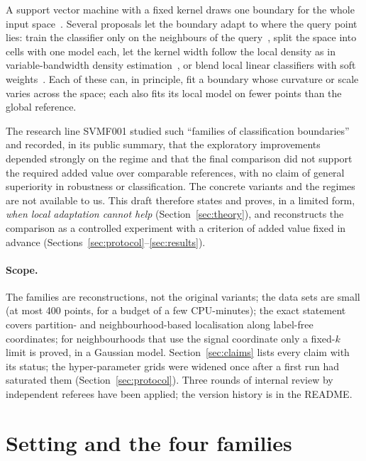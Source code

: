 \documentclass[11pt,a4paper]{article}
\theoremstyle{plain}
\theoremstyle{definition}
\theoremstyle{remark}
\begin{document}
A support vector machine with a fixed kernel draws one boundary for the whole input space~\citep{cortes1995,scholkopf2002,steinwart2008,hastie2009}. Several proposals let the boundary adapt to where the query point lies: train the classifier only on the neighbours of the query~\citep{bottou1992,zhang2006,cheng2007,segata2010}, split the space into cells with one model each, let the kernel width follow the local density as in variable-bandwidth density estimation~\citep{abramson1982,terrell1992}, or blend local linear classifiers with soft weights~\citep{ladicky2011}. Each of these can, in principle, fit a boundary whose curvature or scale varies across the space; each also fits its local model on fewer points than the global reference.

The research line SVMF001 studied such ``families of classification boundaries'' and recorded, in its public summary, that the exploratory improvements depended strongly on the regime and that the final comparison did not support the required added value over comparable references, with no claim of general superiority in robustness or classification. The concrete variants and the regimes are not available to us. This draft therefore states and proves, in a limited form, \emph{when local adaptation cannot help} (Section~\ref{sec:theory}), and reconstructs the comparison as a controlled experiment with a criterion of added value fixed in advance (Sections~\ref{sec:protocol}--\ref{sec:results}).

\paragraph{Scope.} The families are reconstructions, not the original variants; the data sets are small (at most 400 points, for a budget of a few CPU-minutes); the exact statement covers partition- and neighbourhood-based localisation along label-free coordinates; for neighbourhoods that use the signal coordinate only a fixed-$k$ limit is proved, in a Gaussian model. Section~\ref{sec:claims} lists every claim with its status; the hyper-parameter grids were widened once after a first run had saturated them (Section~\ref{sec:protocol}). Three rounds of internal review by independent referees have been applied; the version history is in the README.

\section{Setting and the four families}\label{sec:setting}
\end{document}
